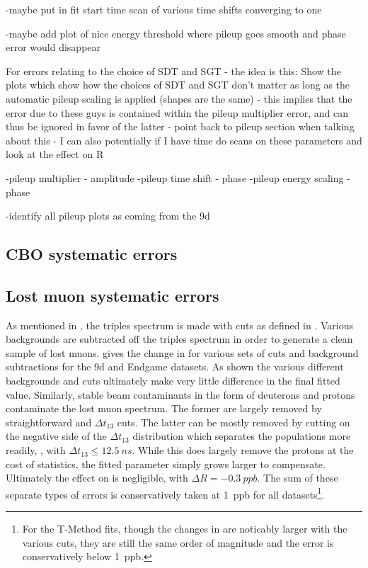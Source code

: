 -maybe put in fit start time scan of various time shifts converging to one

-maybe add plot of nice energy threshold where pileup goes smooth and phase error would disappear




For errors relating to the choice of SDT and SGT - the idea is this: Show the plots which show how the choices of SDT and SGT don't matter as long as the automatic pileup scaling is applied (shapes are the same) - this implies that the error due to these guys is contained within the pileup multiplier error, and can thus be ignored in favor of the latter - point back to pileup section when talking about this - I can also potentially if I have time do scans on these parameters and look at the effect on R



-pileup multiplier - amplitude
-pileup time shift - phase
-pileup energy scaling - phase

-identify all pileup plots as coming from the 9d


\subsection{CBO systematic errors}
\label{sub:cboerror}



\subsection{Lost muon systematic errors}
\label{sub:lostmuonserror}


As mentioned in , the triples spectrum is made with cuts as defined in . Various backgrounds are subtracted off the triples spectrum in order to generate a clean sample of lost muons.  gives the change in \R for various sets of cuts and background subtractions for the 9d and Endgame datasets. As shown the various different backgrounds and cuts ultimately make very little difference in the final fitted \R value. Similarly, stable beam contaminants in the form of deuterons and protons contaminate the lost muon spectrum. The former are largely removed by straightforward \DT and $\Delta t_{13}$ cuts. The latter can be mostly removed by cutting on the negative side of the $\Delta t_{13}$ distribution which separates the populations more readily, , with $\Delta t_{13} \leq \SI{12.5}{ns}$. While this does largely remove the protons at the cost of statistics, the fitted \K parameter simply grows larger to compensate. Ultimately the effect on \R is negligible, with $\Delta R = \SI{-0.3}{ppb}$. The sum of these separate types of errors is conservatively taken at \SI{1}{ppb} for all datasets\footnote{For the T-Method fits, though the changes in \R are noticably larger with the various cuts, they are still the same order of magnitude and the error is conservatively below \SI{1}{ppb}.}.


